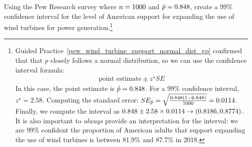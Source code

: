 \begin{exercise}
Using the Pew Research survey where $n = 1000{}$ and
$\hat{p} = 0.848{}$, create a 99\% confidence interval
for the level of American support for expanding the use of wind
turbines for power
generation.\footnote{Guided
Practice~\ref{pew_wind_turbine_support_normal_dist_gp}
confirmed that that $\hat{p}$ closely follows a normal distribution,
so we can use the confidence interval formula:
\begin{align*}
\text{point estimate} \pm z^{\star} SE
\end{align*}
In this case, the point estimate is $\hat{p} = 0.848{}$.
For a 99\% confidence interval, $z^{\star} = 2.58$. Computing the
standard error:
$SE_{\hat{p}}
  = \sqrt{\frac{0.848{}(1 - 0.848{})}
      {1000{}}}
  = 0.0114{}$.
Finally, we compute the interval as
$0.848{} \pm 2.58 \times 0.0114{} \to (0.8186, 0.8774)$.
It is also important to \emph{always} provide an interpretation
for the interval: we are 99\% confident the proportion of
American adults that support expanding the use of wind
turbines is between 81.9\% and 87.7\% in 2018.}
\end{exercise}

%
%
%  
%



